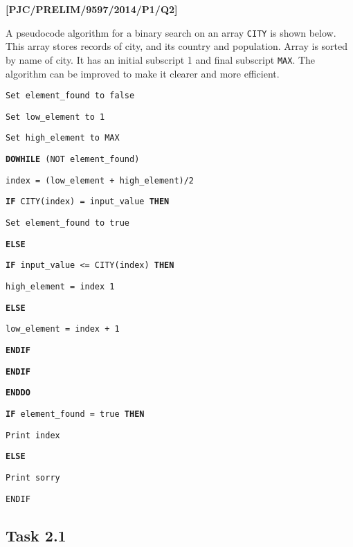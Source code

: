 \item \textbf{{[}PJC/PRELIM/9597/2014/P1/Q2{]} }

A pseudocode algorithm for a binary search on an array \texttt{CITY}
is shown below. This array stores records of city, and its country
and population. Array is sorted by name of city. It has an initial
subscript 1 and final subscript \texttt{MAX}. The algorithm can be
improved to make it clearer and more efficient. 

\noindent %
\noindent\begin{minipage}[t]{1\columnwidth}%
\texttt{Set element\_found to false }

\texttt{Set low\_element to 1 }

\texttt{Set high\_element to MAX }

\texttt{\textbf{DOWHILE}}\texttt{ (NOT element\_found)}

\texttt{\qquad{}index = (low\_element + high\_element)/2 }

\texttt{\qquad{}}\texttt{\textbf{IF}}\texttt{ CITY(index) = input\_value
}\texttt{\textbf{THEN}}\texttt{ }

\texttt{\qquad{}\qquad{}Set element\_found to true }

\texttt{\qquad{}}\texttt{\textbf{ELSE}}\texttt{ }

\texttt{\qquad{}\qquad{}}\texttt{\textbf{IF}}\texttt{ input\_value
<= CITY(index) }\texttt{\textbf{THEN}}\texttt{ }

\texttt{\qquad{}\qquad{}\qquad{}high\_element = index \textendash{}
1 }

\texttt{\qquad{}\qquad{}}\texttt{\textbf{ELSE}}\texttt{ }

\texttt{\qquad{}\qquad{}\qquad{}low\_element = index + 1 }

\texttt{\qquad{}\qquad{}}\texttt{\textbf{ENDIF}}

\texttt{\qquad{}}\texttt{\textbf{ENDIF}}\texttt{ }

\texttt{\textbf{ENDDO}}

\texttt{\textbf{IF}}\texttt{ element\_found = true }\texttt{\textbf{THEN}}\texttt{ }

\texttt{\qquad{}Print index}

\texttt{\textbf{ELSE}}\texttt{ }

\texttt{\qquad{}Print \textquotedbl sorry\textquotedbl{} }

\texttt{ENDIF }%
\end{minipage}

\subsection*{Task 2.1 }

